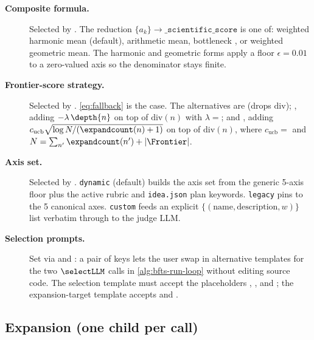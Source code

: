 \begin{description}
  \item[\textbf{Composite formula.}]
        Selected by . The reduction
        $\{a_k\}\!\to\!\texttt{\_scientific\_score}$ is one of:
        weighted harmonic mean (default), arithmetic mean, bottleneck
        , or weighted geometric mean. The
        harmonic and geometric forms apply a floor $\epsilon=0.01$
        to a zero-valued axis so the denominator stays finite.
  \item[\textbf{Frontier-score strategy.}]
        Selected by .
        \cref{eq:fallback} is the
         case. The alternatives
        are  (drops $\mathrm{div}$);
        , adding
        $-\lambda\,\depth{n}$ on top of $\mathrm{div}(n)$
        with $\lambda=$; and
        , adding
        $c_{\mathrm{ucb}}\sqrt{\log N / (\expandcount(n)+1)}$ on top of
        $\mathrm{div}(n)$, where $c_{\mathrm{ucb}}=$ and
        $N = \sum_{n'}\expandcount(n')+|\Frontier|$.
  \item[\textbf{Axis set.}]
        Selected by .
        \texttt{dynamic} (default) builds the axis set from the
        generic 5-axis floor plus the active rubric and
        \texttt{idea.json} plan keywords. \texttt{legacy} pins to the
        5 canonical axes. \texttt{custom} feeds an explicit
        $\{(\mathrm{name},\mathrm{description},w)\}$ list verbatim
        through to the judge LLM.
  \item[\textbf{Selection prompts.}]
        Set via  and
        : a pair of
         keys lets the user
        swap in alternative templates for the two
        $\selectLLM$ calls in \cref{alg:bfts-run-loop} without
        editing source code. The selection template must accept the
        placeholders , ,
        and ; the expansion-target template accepts
         and .
\end{description}

\subsection{Expansion (one child per call)}\label{sec:exploration:expansion}

